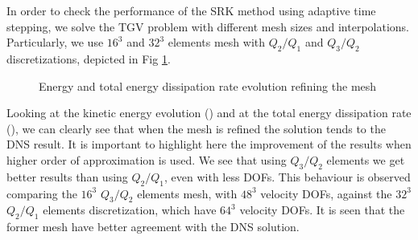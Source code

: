 In order to check the performance of the SRK method using adaptive time stepping, we solve the TGV problem with different mesh sizes and interpolations. Particularly, we use $ 16^3 $ and $ 32^3 $ elements mesh with $ Q_2/Q_1 $ and $ Q_3/Q_2 $ discretizations, depicted in Fig \ref{fig-TGV_SRK_refinement}.
\begin{figure}[h!]
  \centering
  \caption{Energy and total energy dissipation rate evolution refining the mesh}
  \label{fig-TGV_SRK_refinement}
\end{figure}
Looking at the kinetic energy evolution () and at the total energy dissipation rate (), we can clearly see that when the mesh is refined the solution tends to the DNS result. It is important to highlight here the improvement of the results when higher order of approximation is used. We see that using $ Q_3/Q_2 $ elements we get better results than using $ Q_2/Q_1 $, even with less DOFs. This behaviour is observed comparing the $ 16^3 $ $ Q_3/Q_2 $ elements mesh, with $ 48^3 $ velocity DOFs, against the $ 32^3 $ $ Q_2/Q_1 $ elements discretization, which have $ 64^3 $ velocity DOFs. It is seen that the former mesh have better agreement with the DNS solution.


